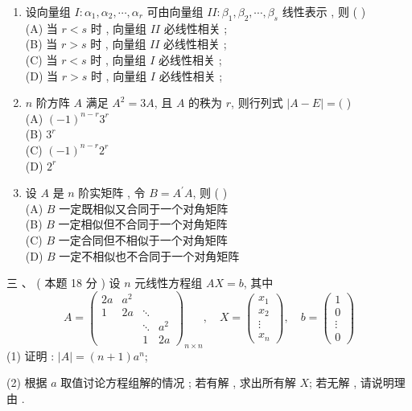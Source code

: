 \documentclass[10pt]{article}
\begin{document}
{\begin{enumerate}
  \item  设向量组  $I: \alpha_{1}, \alpha_{2}, \cdots, \alpha_{r}$  可由向量组  $I I: \beta_{1}, \beta_{2}, \cdots, \beta_{s}$  线性表示 ,  则 ( )\\
(A)  当  $r<s$  时 ,  向量组  $I I$  必线性相关 ;\\
(B)  当  $r>s$  时 ,  向量组  $I I$  必线性相关 ;\\
(C)  当  $r<s$  时 ,  向量组  $I$  必线性相关 ;\\
(D)  当  $r>s$  时 ,  向量组  $I$  必线性相关 ;

  \item $n$  阶方阵  $A$  满足  $A^{2}=3 A$,  且  $A$  的秩为  $r$,  则行列式  $|A-E|=($ )\\
(A) $(-1)^{n-r} 3^{r}$\\
(B) $3^{r}$\\
(C) $(-1)^{n-r} 2^{r}$\\
(D) $2^{r}$

  \item  设  $A$  是  $n$  阶实矩阵 ,  令  $B=A^{\prime} A$,  则  ( )\\
(A) $B$  一定既相似又合同于一个对角矩阵 \\
(B) $B$  一定相似但不合同于一个对角矩阵 \\
(C) $B$  一定合同但不相似于一个对角矩阵 \\
(D) $B$  一定不相似也不合同于一个对角矩阵 

\end{enumerate}
 三 、 ( 本题  18  分 )  设  $n$  元线性方程组  $A X=b$,  其中 
$$
A=\left(\begin{array}{cccc}
2 a & a^{2} & & \\
1 & 2 a & \ddots & \\
& & \ddots & a^{2} \\
& & 1 & 2 a
\end{array}\right)_{n \times n}, \quad X=\left(\begin{array}{c}
x_{1} \\
x_{2} \\
\vdots \\
x_{n}
\end{array}\right), \quad b=\left(\begin{array}{c}
1 \\
0 \\
\vdots \\
0
\end{array}\right)
$$
(1)  证明 : $|A|=(n+1) a^{n}$;

(2)  根据  $a$  取值讨论方程组解的情况 ;  若有解 ,  求出所有解  $X$;  若无解 ,  请说明理由 .

}
\end{document}
